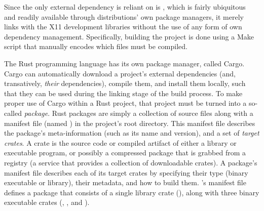 Since the only external dependency \wmcpp is reliant on is , which
is fairly ubiquitous and readily available through distributions' own package
managers, it merely links with the X11 development libraries without the use
of any form of own dependency management. Specifically, building the project
is done using a \textup{Make} script that manually encodes which files must be
compiled.





The Rust programming language has its own package manager, called
\textup{Cargo}. \textup{Cargo} can automatically download a project's external
dependencies (and, transatively, \textit{their} dependencies), compile them, and
install them locally, such that they can be used during the linking stage of the
build process\cite{thecargobook}. To make proper use of \textup{Cargo} within
a Rust project, that project must be turned into a so-called \textit{package}.
Rust packages are simply a collection of source files along with a manifest file
(named ) in the project's root directory. This manifest file
describes the package's meta-information (such as its name and version), and a
set of \textit{target crates}\cite{thecargobook}. A crate is the source code
or compiled artifact of either a library or executable program, or possibly a
compressed package that is grabbed from a registry (a service that provides a
collection of downloadable crates)\cite{thecargobook}. A package's manifest file
describes each of its target crates by specifying their type (binary executable
or library), their metadata, and how to build them\cite{thecargobook}.
\wmrs's manifest file defines a package that consists of a single library
crate (), along with three binary executable crates (,
, and ).


